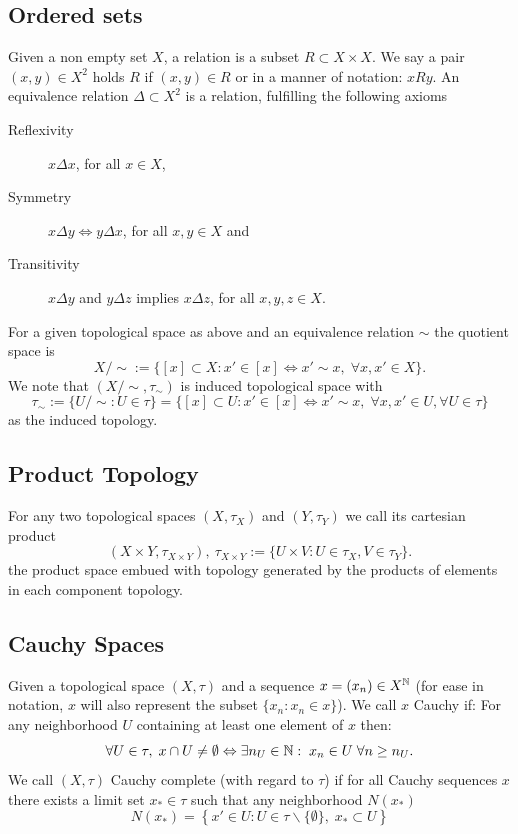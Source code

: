 \subsection{Ordered sets}
Given a non empty set $X$, a relation is a subset $R \subset X \times X$. We say a pair $(x,y) \in X^2$ holds $R$ if $(x,y) \in R$ or in a manner of notation: $x R y$. An equivalence relation $\Delta \subset X^2$ is a relation, fulfilling the following axioms
\begin{description}
\item[Reflexivity] $x \Delta x$, for all $x \in X$,
\item[Symmetry] $x \Delta y \Leftrightarrow y \Delta x$, for all $x, y \in X$ and
\item[Transitivity] $x \Delta y$ and $y \Delta z$ implies $x \Delta z$, for all $x, y, z \in X$.
\end{description}
For a given topological space as above and an equivalence relation $\sim$ the quotient space is
$$X/\sim := \{[x] \subset X : x' \in [x] \Leftrightarrow x' \sim x,\;\forall x, x' \in X\}.$$
We note that $(X/\sim,\tau_{\sim})$ is induced topological space with
$$\tau_\sim := \{U/\sim : U \in \tau\} = \{[x] \subset U: x' \in [x] \Leftrightarrow x' \sim x,\;\forall x, x' \in U, \forall U \in \tau\}$$
as the induced topology.
\subsection{Product Topology}
For any two topological spaces $(X,\tau_X)$ and $(Y,\tau_Y)$ we call its cartesian product
$$(X \times Y, \tau_{X \times Y}), \ \tau_{X \times Y} := \{U \times V : U \in \tau_X, V \in \tau_Y\}.$$
the product space embued with topology generated by the products of elements in each component topology.
\subsection{Cauchy Spaces}
Given a topological space $(X,\tau)$ and a sequence $x = (x_n) \in X^{\nz}$ (for ease in notation, $x$ will also represent the subset $\{x_n : x_n \in x\}$). We call $x$
Cauchy if:
For any neighborhood $U$ containing at least one element of $x$ then:
$$\forall U \in \tau,\; x \cap U \neq \emptyset \Leftrightarrow \exists n_U \in \nz:\; x_n \in U\; \forall n \geq n_U.$$
We call $(X,\tau)$ Cauchy complete (with regard to $\tau$) if for all Cauchy sequences $x$ there exists a limit set $x_* \in \tau$ such that any neighborhood $N(x_*)$
$$N(x_*) = \left\{x' \in U : U \in \tau \backslash \{\emptyset\},\; x_* \subset U\right\}$$
$$